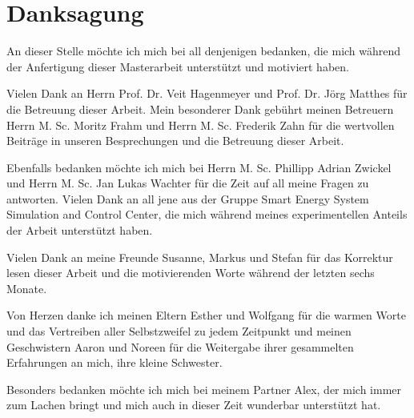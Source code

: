 \chapter{Danksagung}
\thispagestyle{empty}
An dieser Stelle möchte ich mich bei all denjenigen bedanken, die mich während der Anfertigung dieser Masterarbeit unterstützt und motiviert haben.\newline

\noindent
Vielen Dank an Herrn Prof. Dr. Veit Hagenmeyer und Prof. Dr. Jörg Matthes für die Betreuung dieser Arbeit.\newline
Mein besonderer Dank gebührt meinen Betreuern Herrn M. Sc. Moritz Frahm und Herrn M. Sc. Frederik Zahn für die wertvollen Beiträge in unseren Besprechungen und die Betreuung dieser Arbeit.\newline

\noindent
Ebenfalls bedanken möchte ich mich bei Herrn M. Sc. Phillipp Adrian Zwickel und Herrn M. Sc. Jan Lukas Wachter für die Zeit auf all meine Fragen zu antworten.  Vielen Dank an all jene aus der Gruppe Smart Energy System Simulation and Control Center, die mich während meines experimentellen Anteils der Arbeit unterstützt haben.\newline

\noindent
Vielen Dank an meine Freunde Susanne, Markus und Stefan für das Korrektur lesen dieser Arbeit und die motivierenden Worte während der letzten sechs Monate.\newline

\noindent
Von Herzen danke ich meinen Eltern Esther und Wolfgang für die warmen Worte und das Vertreiben aller Selbstzweifel zu jedem Zeitpunkt und meinen Geschwistern Aaron und Noreen für die Weitergabe ihrer gesammelten Erfahrungen an mich, ihre kleine Schwester.\newline

\noindent
Besonders bedanken möchte ich mich bei meinem Partner Alex, der mich immer zum Lachen bringt und mich auch in dieser Zeit wunderbar unterstützt hat.\newline
